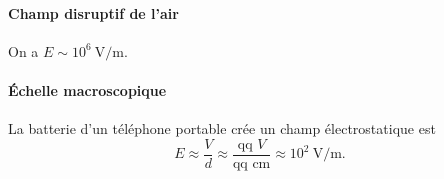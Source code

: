         \paragraph{Champ disruptif de l'air}

            On a $E\sim 10^{6}~\si{\volt\per\metre}$.

        \paragraph{Échelle macroscopique}

            La batterie d'un téléphone portable crée un champ électrostatique est
            \begin{equation}
                E\approx \frac{V}{d}\approx \frac{\text{qq } V}{\text{qq } \si{\centi\metre}}\approx10^{2}~\si{\volt\per\metre}.
            \end{equation}